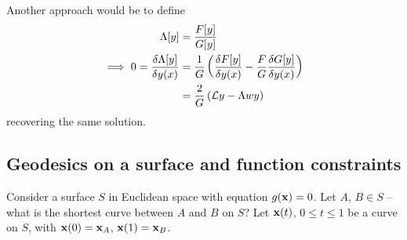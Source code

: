 \documentclass{../template/note}
\begin{document}
    Another approach would be to define
    \begin{align*}
        \Lambda[y] &= \frac{F[y]}{G[y]} \\
        \implies 0 = \frac{\delta \Lambda[y]}{\delta y(x)} &= \frac 1 G \left(\frac{\delta F[y]}{\delta y(x)} - \frac F G \frac{\delta G[y]}{\delta y(x)}\right) \\
        &= \frac 2 G \left(\mathcal{L} y - \Lambda w y\right)
    \end{align*}
    recovering the same solution.
    
    \subsection{Geodesics on a surface and function constraints}

    Consider a surface $S$ in Euclidean space with equation $g(\V x) = 0$. Let $A$, $B \in S$ -- what is the shortest curve between $A$ and $B$ on $S$? Let $\V x(t)$, $0 \leq t \leq 1$ be a curve on $S$, with $\V x(0) = \V x_A$, $\V x(1) = \V x_B$.
\end{document}

